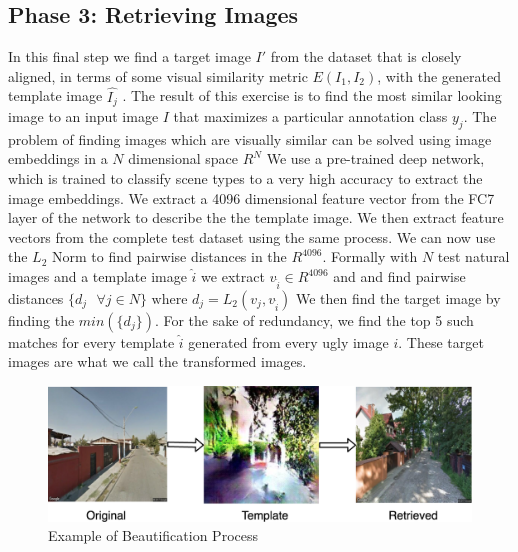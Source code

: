 \subsection{Phase 3: Retrieving Images }
In this final step we find a target image $I'$ from the dataset that is closely aligned, in terms of some visual similarity metric $E(I_1, I_2)$, with the generated template image  $\hat{I_j}$ . The result of this exercise is to find the most similar looking image to an input image $I$ that maximizes a particular annotation class $y_j$.
The problem of finding images which are visually similar can be solved using image embeddings in a $N$ dimensional space $R^N$
We use a pre-trained deep  network, which is trained to classify scene types to a very high accuracy \cite{zhou2014learning} to extract the image embeddings. We extract a 4096 dimensional feature vector from the FC7 layer of the network to describe the the template image. We then extract feature vectors from the complete test dataset using the same process. We can now use the $L_2$ Norm to find pairwise distances in the $R^{4096}$. Formally with $N$ test natural images and a template image $\hat{i}$ we extract $v_{\hat{i}} \in R^{4096}$ and and find pairwise distances  $\{d_j \text{  }\forall j \in N\} \text{ where } d_j = L_2(v_j , v_{\hat{i}})$ 
We then find the target image by finding the $min(\{d_j\})$. For the sake of redundancy, we find the top 5 such matches for every template $\hat{i}$ generated from every ugly image $i$. These target images are what we call the transformed images.

\begin{figure}[h]
	\centering
	\includegraphics[width=0.5\linewidth]{Plot/Example.png}
	\caption{Example of Beautification Process}
	\label{fig:BeautyExample}
\end{figure}

